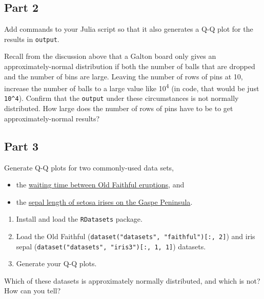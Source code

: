 \documentclass[
  11pt,
]{book}
\providecommand{\tightlist}{%
  \setlength{\itemsep}{0pt}\setlength{\parskip}{0pt}}
\begin{document}
\hypertarget{part-2-1}{%
\subsection*{Part 2}\label{part-2-1}}


Add commands to your Julia script so that it also generates a Q-Q plot for the results in \texttt{output}.

Recall from the discussion above that a Galton board only gives an approximately-normal distribution if both the number of balls that are dropped and the number of bins are large. Leaving the number of rows of pins at 10, increase the number of balls to a large value like 10\textsuperscript{4} (in code, that would be just \texttt{10\^{}4}). Confirm that the \texttt{output} under these circumstances is not normally distributed. How large does the number of rows of pins have to be to get approximately-normal results?

\hypertarget{part-3}{%
\subsection*{Part 3}\label{part-3}}


Generate Q-Q plots for two commonly-used data sets,

\begin{itemize}
\tightlist
\item
  the \href{https://www.rdocumentation.org/packages/datasets/versions/3.6.2/topics/faithful}{waiting time between Old Faithful eruptions}, and
\item
  the \href{https://www.rdocumentation.org/packages/datasets/versions/3.6.2/topics/iris}{sepal length of setosa irises on the Gaspe Peninsula}.
\end{itemize}

\begin{enumerate}
\def\labelenumi{\arabic{enumi}.}
\tightlist
\item
  Install and load the \texttt{RDatasets} package.
\item
  Load the Old Faithful (\texttt{dataset("datasets",\ "faithful"){[}:,\ 2{]}}) and iris sepal (\texttt{dataset("datasets",\ "iris3"){[}:,\ 1,\ 1{]}}) datasets.
\item
  Generate your Q-Q plots.
\end{enumerate}

Which of these datasets is approximately normally distributed, and which is not? How can you tell?

\backmatter

\renewcommand\bibname{References}
  
\end{document}
